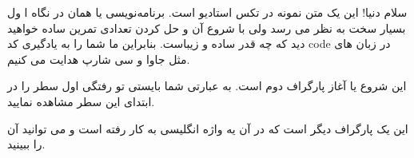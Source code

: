\documentclass{article}
\begin{document}
	سلام دنیا! این یک متن نمونه در تکس استادیو است. برنامه‌نویسی یا همان 
	در نگاه ا ول بسیار سخت به نظر می رسد ولی با شروع آن و حل کردن تعدادی تمرین ساده خواهید دید که چه قدر ساده و زیباست.
	 بنابراین ما شما را به یادگیری کد 
	  code
	   در زبان های مثل جاوا 
	    و سی شارپ هدایت می کنیم. 
	
	این شروع یا آغاز پارگراف دوم است. به عبارتی شما بایستی تو رفتگی اول سطر را در ابتدای این سطر مشاهده نمایید.
	
	این یک پارگراف دیگر است که در آن یه واژه انگلیسی 
به کار رفته است و می توانید آن را ببینید.
\end{document}
